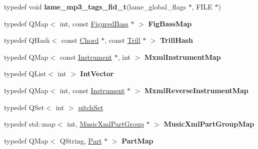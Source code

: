 \begin{DoxyCompactItemize}
\item 
\mbox{\label{namespace_ms_aaff113d4a26e546699bb7eb20d88e123}} 
typedef void {\bfseries lame\+\_\+mp3\+\_\+tags\+\_\+fid\+\_\+t}(lame\+\_\+global\+\_\+flags $\ast$, F\+I\+LE $\ast$)
\item 
\mbox{\label{namespace_ms_a0aac5f7abe0d282c8b6046bfa4b0383f}} 
typedef Q\+Map$<$ int, const \hyperlink{class_ms_1_1_figured_bass}{Figured\+Bass} $\ast$ $>$ {\bfseries Fig\+Bass\+Map}
\item 
\mbox{\label{namespace_ms_a2b30594d32f8bc7ff460d9a39a3c24ac}} 
typedef Q\+Hash$<$ const \hyperlink{class_ms_1_1_chord}{Chord} $\ast$, const \hyperlink{class_ms_1_1_trill}{Trill} $\ast$ $>$ {\bfseries Trill\+Hash}
\item 
\mbox{\label{namespace_ms_ab20b0db1398ac7851f84cc5eba0672a2}} 
typedef Q\+Map$<$ const \hyperlink{class_ms_1_1_instrument}{Instrument} $\ast$, int $>$ {\bfseries Mxml\+Instrument\+Map}
\item 
\mbox{\label{namespace_ms_a653c3325067d3d97d4f2c73d263209af}} 
typedef Q\+List$<$ int $>$ {\bfseries Int\+Vector}
\item 
\mbox{\label{namespace_ms_a0e25fe21355f1f62948efcff732dba4d}} 
typedef Q\+Map$<$ int, const \hyperlink{class_ms_1_1_instrument}{Instrument} $\ast$ $>$ {\bfseries Mxml\+Reverse\+Instrument\+Map}
\item 
typedef Q\+Set$<$ int $>$ \hyperlink{namespace_ms_a3d8513692c92aa394efc33a044448337}{pitch\+Set}
\item 
\mbox{\label{namespace_ms_a3654dc5bacc755bafe0cb26d872e3ef0}} 
typedef std\+::map$<$ int, \hyperlink{struct_ms_1_1_music_xml_part_group}{Music\+Xml\+Part\+Group} $\ast$ $>$ {\bfseries Music\+Xml\+Part\+Group\+Map}
\item 
\mbox{\label{namespace_ms_a4cbd5ed5c2686caeabaf14374b7ea9a7}} 
typedef Q\+Map$<$ Q\+String, \hyperlink{class_ms_1_1_part}{Part} $\ast$ $>$ {\bfseries Part\+Map}
\item 
\mbox{\label{namespace_ms_a854edca937023049bd4111fad831aea0}} 

\end{DoxyCompactItemize}
